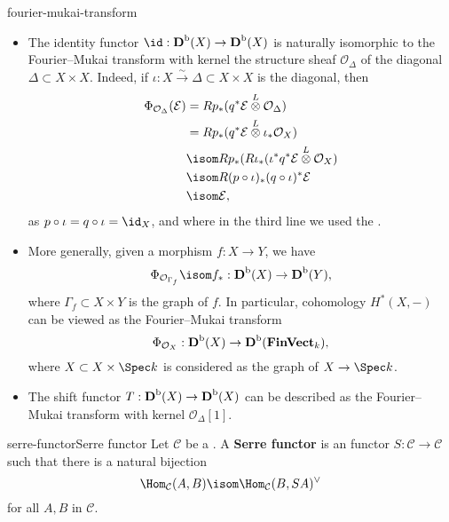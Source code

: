 \begin{example}{fourier-mukai-transform}
    \begin{itemize}
        \item The identity functor $\id : \textbf{D}^\textup{b}(X) \to \textbf{D}^\textup{b}(X)$ is naturally isomorphic to the Fourier--Mukai transform with kernel the structure sheaf $\mathcal{O}_\Delta$ of the diagonal $\Delta \subset X \times X$. Indeed, if $\iota : X \xrightarrow{\sim} \Delta \subset X \times X$ is the diagonal, then
        \[ \begin{aligned}
            \Phi_{\mathcal{O}_\Delta}(\mathcal{E})
                &= R p_* (q^* \mathcal{E} \overset{L}{\otimes} \mathcal{O}_\Delta) \\
                &= R p_* (q^* \mathcal{E} \overset{L}{\otimes} \iota_* \mathcal{O}_X) \\
                &\isom R p_* (R \iota_* (\iota^* q^* \mathcal{E} \overset{L}{\otimes} \mathcal{O}_X) \\
                &\isom R (p \circ \iota)_* (q \circ \iota)^* \mathcal{E} \\
                &\isom \mathcal{E} ,
        \end{aligned} \]
        as $p \circ \iota = q \circ \iota = \id_X$, and where in the third line we used the .
        
        \item More generally, given a morphism $f : X \to Y$, we have
        \[ \Phi_{\mathcal{O}_{\Gamma_f}} \isom f_* : \textbf{D}^\textup{b}(X) \to \textbf{D}^\textup{b}(Y) , \]
        where $\Gamma_f \subset X \times Y$ is the graph of $f$. In particular, cohomology $H^*(X, -)$ can be viewed as the Fourier--Mukai transform
        \[ \Phi_{\mathcal{O}_X} : \textbf{D}^\textup{b}(X) \to \textbf{D}^\textup{b}(\textbf{FinVect}_k) , \]
        where $X \subset X \times \Spec k$ is considered as the graph of $X \to \Spec k$.
        
        \item The shift functor $T : \textbf{D}^\textup{b}(X) \to \textbf{D}^\textup{b}(X)$ can be described as the Fourier--Mukai transform with kernel $\mathcal{O}_{\Delta}[1]$.
    \end{itemize}
\end{example}

\begin{topic}{serre-functor}{Serre functor}
    Let $\mathcal{C}$ be a . A \textbf{Serre functor} is an  functor $S : \mathcal{C} \to \mathcal{C}$ such that there is a natural bijection
    \[ \Hom_\mathcal{C}(A, B) \isom \Hom_\mathcal{C}(B, SA)^\vee \]
    for all $A, B$ in $\mathcal{C}$.
\end{topic}


